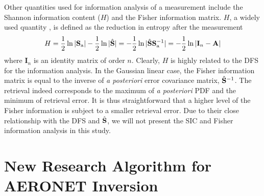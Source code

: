 Other quantities used for information analysis of a measurement include
the Shannon information content ($H$) \citep{Shannon48} and the Fisher
information matrix. $H$, a widely used quantity \citep[e.g.,][]{Rodgers98,
Knobelspiesse12}, is defined as the reduction in entropy after 
the measurement
\begin{equation}
H=\frac{1}{2}\ln{|\mathbf{S}_\text{a}|}-\frac{1}{2}\ln{|\hat{\mathbf{S}}|}
 =-\frac{1}{2}\ln{|\hat{\mathbf{S}}\mathbf{S}_\text{a}^{-1}|}
 =-\frac{1}{2}\ln{|\mathbf{I}_n-\mathbf{A}|}
\end{equation}
where $\mathbf{I}_n$ is an identity matrix of order $n$. Clearly, 
$H$ is highly related to the DFS for the information analysis. 
In the Gaussian linear case, the Fisher information matrix is equal 
to the inverse of \textit{a posteriori} error covariance matrix, 
$\hat{\mathbf{S}}^{-1}$. The retrieval indeed corresponds to the maximum 
of \textit{a posteriori} PDF and the minimum of retrieval error. It is thus 
straightforward that a higher level of the Fisher information is 
subject to a smaller retrieval error. Due to their close 
relationship with the DFS and $\hat{\mathbf{S}}$, we will not present 
the SIC and Fisher information analysis in this study. 

\section{New Research Algorithm for AERONET Inversion}
\label{sec:algorithm}

